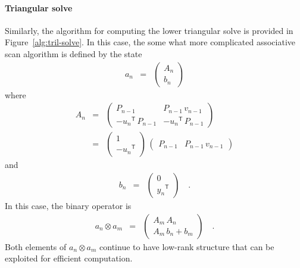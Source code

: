\documentclass[10pt]{article}
\newcommand{\T}{^{\!\mathsf{T}\!}}
\begin{document}
\paragraph{Triangular solve}
Similarly, the algorithm for computing the lower triangular solve is provided in Figure~\ref{alg:tril-solve}.
In this case, the some what more complicated associative scan algorithm is defined by the state
\begin{eqnarray}
  a_n &=& \left(\begin{array}{c}
    A_n \\
    b_n
  \end{array}\right)
\end{eqnarray}
where
\begin{eqnarray}
  A_n &=& \left(\begin{array}{cc}
    P_{n-1}           & P_{n-1}\,v_{n-1}  \\
    -{u_n}\T\,P_{n-1} & -{u_n}\T\,P_{n-1}
  \end{array}\right) \\
  &=& \left(\begin{array}{c}
    1 \\
    -{u_n}\T
  \end{array}\right)\,\left(\begin{array}{cc}
    P_{n-1} & P_{n-1}\,v_{n-1}
  \end{array}\right)
\end{eqnarray}
and
\begin{eqnarray}
  b_n &=& \left(\begin{array}{c}
    0 \\
    {y_n}\T
  \end{array}\right)\quad.
\end{eqnarray}
In this case, the binary operator is
\begin{eqnarray}
  a_n \otimes a_m &=& \left(\begin{array}{c}
    A_m \, A_n \\
    A_m \, b_n + b_m
  \end{array}\right)\quad.
\end{eqnarray}
Both elements of $a_n \otimes a_m$ continue to have low-rank structure that can be exploited for efficient computation.

\end{document}
